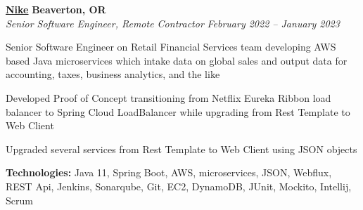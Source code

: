 %
    \headerrow
        {\textbf{\href{https://www.nike.com/}{Nike}}}
        {\textbf{Beaverton, OR}}
    \\
    \headerrow
        {\emph{Senior Software Engineer, Remote Contractor}}
        {\emph{February 2022 -- January 2023}}
    \begin{itemize*}
        \item Senior Software Engineer on Retail Financial Services team developing AWS based Java microservices which intake data on global sales and output data for accounting, taxes, business analytics, and the like
        \item Developed Proof of Concept transitioning from Netflix Eureka Ribbon load balancer to Spring Cloud LoadBalancer while upgrading from Rest Template to Web Client
        \item Upgraded several services from Rest Template to Web Client using JSON objects
    \end{itemize*}

    \hspace{1.0em}
        {\textbf{Technologies:} Java 11, Spring Boot, AWS, microservices, JSON, Webflux, REST Api, Jenkins, Sonarqube, Git, EC2, DynamoDB, JUnit, Mockito, Intellij, Scrum}

